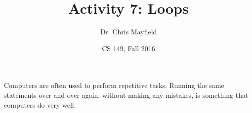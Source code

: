 \documentclass[12pt]{article}
\title{Activity 7: Loops}
\author{Dr. Chris Mayfield}
\date{CS 149, Fall 2016}
\begin{document}
\maketitle

Computers are often used to perform repetitive tasks.
Running the same statements over and over again, without making any mistakes, is something that computers do very well.





\end{document}
